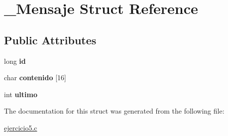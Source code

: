 \hypertarget{struct__Mensaje}{}\section{\+\_\+\+Mensaje Struct Reference}
\label{struct__Mensaje}
\subsection*{Public Attributes}
\begin{DoxyCompactItemize}
\item 
long {\bfseries id}\hypertarget{struct__Mensaje_a216a370cde3eae04df6a81fea5bef338}{}\label{struct__Mensaje_a216a370cde3eae04df6a81fea5bef338}

\item 
char {\bfseries contenido} \mbox{[}16\mbox{]}\hypertarget{struct__Mensaje_a5b4ccf464e92f988ca5430d6ff28fda5}{}\label{struct__Mensaje_a5b4ccf464e92f988ca5430d6ff28fda5}

\item 
int {\bfseries ultimo}\hypertarget{struct__Mensaje_a3392651858c41e0ebf966af022b4d1ec}{}\label{struct__Mensaje_a3392651858c41e0ebf966af022b4d1ec}

\end{DoxyCompactItemize}


The documentation for this struct was generated from the following file\+:\begin{DoxyCompactItemize}
\item 
\hyperlink{ejercicio5_8c}{ejercicio5.\+c}\end{DoxyCompactItemize}
